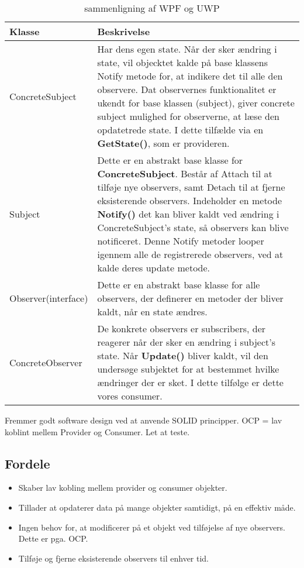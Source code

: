 \documentclass[../SWD_disp.tex]{subfiles}
\begin{document}
\begin{table}[H]
    \centering
    \begin{tabular}{l|p{}}
        Klasse          & Beskrivelse        \\ \toprule
        ConcreteSubject                & Har dens egen state. Når der sker ændring i state, vil objecktet kalde på base klassens Notify metode for, at indikere det til alle den observere. Dat observernes funktionalitet er ukendt for base klassen (subject), giver concrete subject mulighed for observerne, at læse den opdatetrede state. I dette tilfælde via en \textbf{GetState()}, som er provideren.   \\ \midrule
        Subject         & Dette er en abstrakt base klasse for \textbf{ConcreteSubject}. Består af Attach til at tilføje nye observers, samt Detach til at fjerne eksisterende observers. Indeholder en metode \textbf{Notify()} det kan bliver kaldt ved ændring i ConcreteSubject's state, så observers kan blive notificeret. Denne Notify metoder looper igennem alle de registrerede observers, ved at kalde deres update metode.           \\ \midrule
        Observer(interface)    & Dette er en abstrakt base klasse for alle observers, der definerer en metoder der bliver kaldt, når en state ændres.             \\ \midrule
        ConcreteObserver & De konkrete observers er subscribers, der reagerer når der sker en ændring i subject's state. Når \textbf{Update()} bliver kaldt, vil den undersøge subjektet for at bestemmet hvilke ændringer der er sket. I dette tilfølge er dette vores consumer. \\ \bottomrule
    \end{tabular}
    \caption{sammenligning af WPF og UWP}\label{tab:wpfVSuwp}
\end{table}

Fremmer godt software design ved at anvende SOLID principper. OCP = lav koblint mellem Provider og Consumer. Let at teste.

\subsection*{Fordele}
\begin{itemize}
    \item Skaber lav kobling mellem provider og consumer objekter.
    \item Tillader at opdaterer data på mange objekter samtidigt, på en effektiv måde.
    \item Ingen behov for, at modificerer på et objekt ved tilføjelse af nye observers. Dette er pga. OCP.
    \item Tilføje og fjerne eksisterende observers til enhver tid.
\end{itemize}
\end{document}
